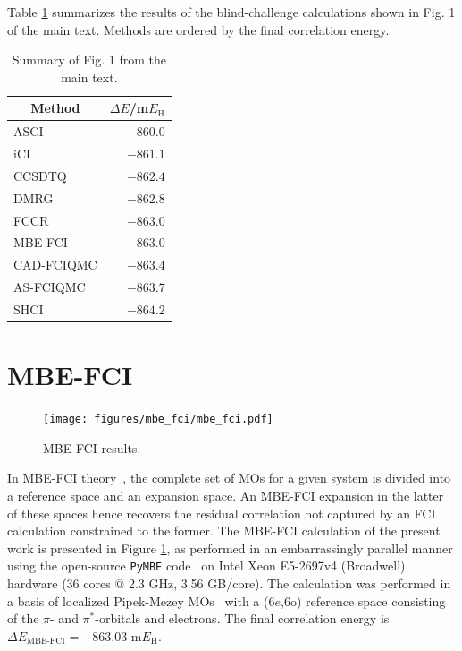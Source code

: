 \documentclass[journal=jcp,manuscript=suppinfo]{achemso}
\begin{document}
Table \ref{results_SI_table} summarizes the results of the blind-challenge calculations shown in Fig. 1 of the main text. Methods are ordered by the final correlation energy.
%
\begin{table}[ht]
\begin{center}
\caption{Summary of Fig. 1 from the main text.}
\label{results_SI_table}
\begin{tabular}{l|r}
\toprule
\multicolumn{1}{c|}{Method} & \multicolumn{1}{c}{$\Delta E$/m$E_{\text{H}}$} \\
\midrule\midrule
ASCI & $-860.0$ \\
iCI & $-861.1$ \\
CCSDTQ & $-862.4$ \\
DMRG & $-862.8$ \\
FCCR & $-863.0$ \\
MBE-FCI & $-863.0$ \\
CAD-FCIQMC & $-863.4$ \\
AS-FCIQMC & $-863.7$ \\
SHCI & $-864.2$ \\
\midrule
\end{tabular}
\vspace{-1.4cm}
\end{center}
\end{table}
%

\section{MBE-FCI}

%
\begin{figure}[ht!]
\begin{center}
\texttt{[image: figures/mbe\_fci/mbe\_fci.pdf]}
\caption{MBE-FCI results.}
\label{mbe_fci_SI_fig}
\end{center}
\vspace{-0.6cm}
\end{figure}
%
In MBE-FCI theory~\cite{eriksen_mbe_fci_jpcl_2017,eriksen_mbe_fci_weak_corr_jctc_2018,eriksen_mbe_fci_strong_corr_jctc_2019,eriksen_mbe_fci_general_jpcl_2019}, the complete set of MOs for a given system is divided into a reference space and an expansion space. An MBE-FCI expansion in the latter of these spaces hence recovers the residual correlation not captured by an FCI calculation constrained to the former. The MBE-FCI calculation of the present work is presented in Figure \ref{mbe_fci_SI_fig}, as performed in an embarrassingly parallel manner using the open-source {\texttt{PyMBE}} code~\cite{pymbe} on Intel Xeon E5-2697v4 (Broadwell) hardware (36 cores $@$ 2.3 GHz, 3.56 GB/core). The calculation was performed in a basis of localized Pipek-Mezey MOs~\cite{pipek_mezey_jcp_1989} with a ($6e$,$6$o) reference space consisting of the $\pi$- and $\pi^{\ast}$-orbitals and electrons. The final correlation energy is $\Delta E_{\text{MBE-FCI}} = -863.03$ m$E_{\text{H}}$.\\
\end{document}
